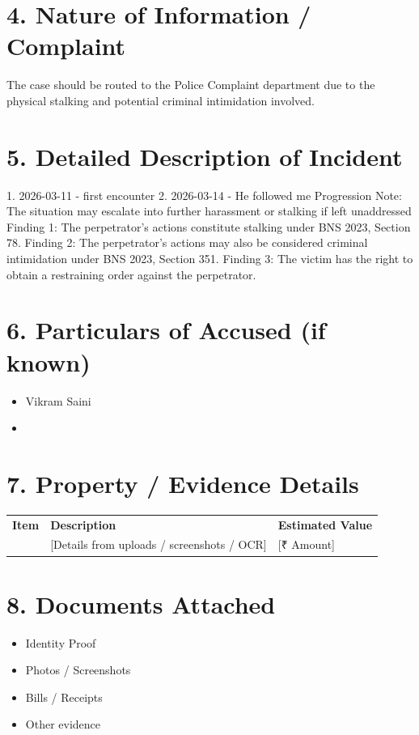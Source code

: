 \documentclass[11pt, a4paper]{article}
\begin{document}
\section{4. Nature of Information / Complaint}
The case should be routed to the Police Complaint department due to the physical stalking and potential criminal intimidation involved.

\section{5. Detailed Description of Incident}
1. 2026-03-11 - first encounter
2. 2026-03-14 - He followed me
Progression Note: The situation may escalate into further harassment or stalking if left unaddressed
Finding 1: The perpetrator's actions constitute stalking under BNS 2023, Section 78.
Finding 2: The perpetrator's actions may also be considered criminal intimidation under BNS 2023, Section 351.
Finding 3: The victim has the right to obtain a restraining order against the perpetrator.

\section{6. Particulars of Accused (if known)}
\begin{itemize}
  \item Vikram Saini
  \item [Address / Description]
\end{itemize}

\section{7. Property / Evidence Details}
\begin{tabular}{lll}
  \textbf{Item} & \textbf{Description} & \textbf{Estimated Value} \\
  [Evidence Item] & [Details from uploads / screenshots / OCR] & [₹ Amount] \\
\end{tabular}

\section{8. Documents Attached}
\begin{itemize}
  \item Identity Proof
  \item Photos / Screenshots
  \item Bills / Receipts
  \item Other evidence
\end{itemize}
\end{document}
